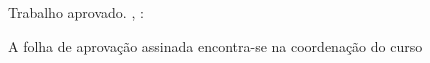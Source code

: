 \begin{folhadeaprovacao}
    \begin{center}
        {\ABNTEXchapterfont\large\imprimirautor}
        \vspace*{\fill}\vspace*{\fill}
            \begin{center}
                \ABNTEXchapterfont\bfseries\Large\imprimirtitulo
            \end{center}
            \vspace*{\fill}
            \hspace{.45\textwidth}
            \begin{minipage}{.5\textwidth}
                \imprimirpreambulo
            \end{minipage}%
            \vspace*{\fill}
    \end{center}
    Trabalho aprovado. \imprimirlocal, \Data:
    
    \assinatura{\textbf{\membroA} \\ \membroAinst}
    \assinatura{\textbf{\membroB} \\ \membroBinst}
    
    \begin{center}
        \vspace*{0.5cm}
        {\large\imprimirlocal}
        \par
        {\large\imprimirdata}
        \vspace*{1cm}
        \vfil
        A folha de aprovação assinada encontra-se na coordenação do curso
        
    \end{center}
\end{folhadeaprovacao}
